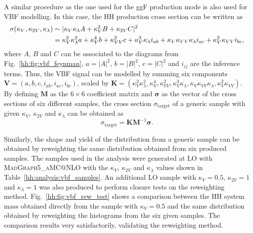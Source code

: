 \documentclass[../main.tex]{subfiles}
\begin{document}
A similar procedure as the one used for the ggF production mode is also used for VBF modelling. In this case, the HH production cross section can be written as
\begin{align}
\sigma(\kappa_V, \kappa_{2V}, \kappa_\lambda) &\sim |\kappa_V\kappa_\lambda A + \kappa_V^2 B + \kappa_{2V} C| ^2 \notag\\
&= \kappa_V^2\kappa_\lambda^2 a + \kappa_V^4 b + \kappa_{VV}^2 c + \kappa_V^3\kappa_\lambda i_{ab} + \kappa_V\kappa_{VV}\kappa_\lambda i_{ac} + \kappa_V^2\kappa_{VV} i_{bc},
\end{align}
where $A$, $B$ and $C$ can be associated to the diagrams from Fig.~\ref{hh:fig:vbf_feynman}, $a = |A|^2$, $b = |B|^2$, $c = |C|^2$ and $i_{ij}$ are the inference terms. Thus, the VBF signal can be modelled by summing six components $\mathbf{V}=(a, b, c, i_{ab}, i_{ac}, i_{bc})$, scaled by $\mathbf{K}=(\kappa_V^2\kappa_\lambda^2, \kappa_V^4, \kappa_{VV}^2, \kappa_V^3\kappa_\lambda, \kappa_V\kappa_{VV}\kappa_\lambda,  \kappa_V^2\kappa_{VV})$. By defining $\mathbf{M}$ as the $6\times6$ coefficient matrix and $\mathbf{\sigma}$ as the vector of the cross sections of six different samples, the cross section $\sigma_\text{target}$ of a generic sample with given $\kappa_V$, $\kappa_{2V}$ and $\kappa_\lambda$ can be obtained as
\begin{equation}
\sigma_\text{target} = \mathbf{K}\mathbf{M}^{-1}\mathbf{\sigma}.
\end{equation}

Similarly, the shape and yield of the distribution from a generic sample can be obtained by reweighting the same distribution obtained from six produced samples. The samples used in the analysis were generated at LO with \textsc{MadGraph5\_aMC@NLO} with the $\kappa_V$, $\kappa_{2V}$ and $\kappa_\lambda$ values shown in Table~\ref{hh:analysis:vbf_samples}. An additional LO sample with $\kappa_V=0.5$, $\kappa_{2V}=1$ and $\kappa_{\lambda}=1$ was also produced to perform closure tests on the reweighting method. Fig.~\ref{hh:fig:vbf_rew_test} shows a comparison between the HH system mass obtained directly from the sample with $\kappa_V=0.5$ and the same distribution obtained by reweighting the histograms from the six given samples. The comparison results very satisfactorily, validating the reweighting method. 
\end{document}
